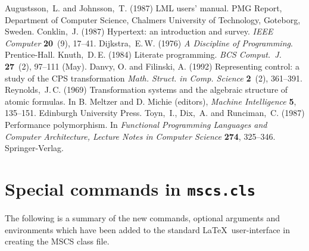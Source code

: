 \documentclass{mscs}
\begin{document}
\begin{thebibliography}{}
   Augustsson,~L. and Johnsson,~T. (1987) LML users' manual. PMG
   Report, Department of Computer Science, Chalmers University of
   Technology, Goteborg, Sweden.
   Conklin,~J. (1987) Hypertext: an introduction and survey.
   \emph{IEEE Computer} \textbf{20}~(9), 17--41.
   Dijkstra,~E.\,W. (1976) \emph{A Discipline of Programming}.
   Prentice-Hall.
   Knuth,~D.\,E. (1984) Literate programming. \emph{BCS Comput.\ J.}
   \textbf{27}~(2), 97--111 (May).
   Danvy, O. and Filinski, A. (1992) Representing control: a study
   of the CPS transformation \emph{Math. Struct. in Comp. Science}
   \textbf{2}~(2), 361--391.
   Reynolds,~J.\,C. (1969) Transformation systems and the
   algebraic structure of atomic formulas. In B. Meltzer and
   D. Michie (editors), \emph{Machine Intelligence} \textbf{5}, 135--151.
   Edinburgh University Press.
   Toyn,~I., Dix,~A. and Runciman,~C. (1987) Performance
   polymorphism. In \emph{Functional Programming Languages and
   Computer Architecture, Lecture Notes in Computer Science}
   \textbf{274}, 325--346. Springer-Verlag.
\end{thebibliography}

\newpage
\appendix

\section{Special commands in \textmd{\texttt{mscs.cls}}}

The following is a summary of the new commands, optional
arguments and environments which have been added to the
standard \LaTeX\ user-interface in creating the MSCS class file.

\vspace{6pt}
\end{document}
